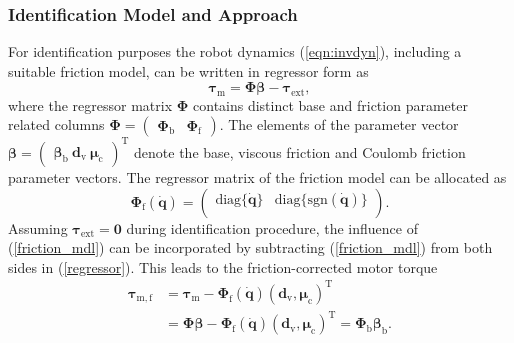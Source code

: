 \subsubsection{Identification Model and Approach}
%
For identification purposes the robot dynamics (\ref{eqn:invdyn}), including a suitable friction model, can be written in regressor form as  
\begin{equation}
\bm{\tau}_{\mathrm{m}} = \bm{\Phi} \bm{\beta} - \bm{\tau}_{\mathrm{ext}},
\label{regressor}
\end{equation}
where the regressor matrix $\bm{\Phi}$ contains distinct base and friction parameter related columns $\bm{\Phi} = \begin{pmatrix} \bm{\Phi}_\mathrm{b} & \bm{\Phi}_\mathrm{f} \end{pmatrix}$. 
The elements of the parameter vector $\bm{\beta} = \begin{pmatrix} \bm{\beta}_\mathrm{b} \ \bm{d}_\mathrm{v} \ \bm{\mu}_\mathrm{c} \end{pmatrix}^{\mathrm{T}}$ denote the base, viscous friction and Coulomb friction parameter vectors. 
The regressor matrix of the friction model can be allocated as 
\begin{equation}
\bm{\Phi}_\mathrm{f}(\dot{\bm{q}}) =   
\begin{pmatrix}
\mathrm{diag}\{\dot{\bm{q}}\}& 
\mathrm{diag}\{\mathrm{sgn}(\dot{\bm{q}})\}\\
\end{pmatrix}.
\label{friction_mdl}
\end{equation} 
Assuming $\bm{\tau}_{\mathrm{ext}} = \bm{0}$ during identification procedure, the influence of (\ref{friction_mdl}) can be incorporated by subtracting (\ref{friction_mdl}) from both sides in (\ref{regressor}).
This leads to the friction-corrected motor torque
\begin{align}
\bm{\tau}_{\mathrm{m},\mathrm {f}} &= 
\bm{\tau}_{\mathrm{m}} -  \bm{\Phi}_{\mathrm{f}} ( \dot{\bm{q}})(\bm{d}_{\mathrm{v}}, \bm{\mu}_{\mathrm{c}})^{\mathrm{T}}\\ 
&=
\bm{\Phi} \bm{\beta} - \bm{\Phi}_{\mathrm{f}} ( \dot{\bm{q}})(\bm{d}_{\mathrm{v}}, \bm{\mu}_{\mathrm{c}})^{\mathrm{T}}=\bm{\Phi}_\mathrm{b}\bm{\beta}_\mathrm{b}.
\end{align}
